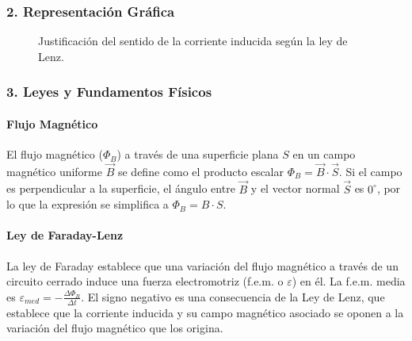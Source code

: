 \subsubsection*{2. Representación Gráfica}
\begin{figure}[H]
    \centering
    \caption{Justificación del sentido de la corriente inducida según la ley de Lenz.}
\end{figure}

\subsubsection*{3. Leyes y Fundamentos Físicos}
\paragraph*{Flujo Magnético} El flujo magnético ($\Phi_B$) a través de una superficie plana $S$ en un campo magnético uniforme $\vec{B}$ se define como el producto escalar $\Phi_B = \vec{B} \cdot \vec{S}$. Si el campo es perpendicular a la superficie, el ángulo entre $\vec{B}$ y el vector normal $\vec{S}$ es $0^\circ$, por lo que la expresión se simplifica a $\Phi_B = B \cdot S$.

\paragraph*{Ley de Faraday-Lenz} La ley de Faraday establece que una variación del flujo magnético a través de un circuito cerrado induce una fuerza electromotriz (f.e.m. o $\varepsilon$) en él. La f.e.m. media es $\varepsilon_{med} = -\frac{\Delta \Phi_B}{\Delta t}$. El signo negativo es una consecuencia de la Ley de Lenz, que establece que la corriente inducida y su campo magnético asociado se oponen a la variación del flujo magnético que los origina.

